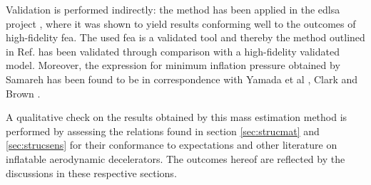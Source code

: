 Validation is performed indirectly: the method \cite{Samareh2011} has been applied in the \gls{edlsa} project \cite{Cianciolo2010}, where it was shown to yield results conforming well to the outcomes of high-fidelity \gls{fea}. The used \gls{fea} is a validated tool \cite{Cianciolo2010} and thereby the method outlined in Ref.\cite{Samareh2011} has been validated through comparison with a high-fidelity validated model. Moreover, the expression for minimum inflation pressure obtained by Samareh has been found to be in correspondence with Yamada et al \cite{Yamada2009}, Clark \cite{Clark2009} and Brown \cite{Brown2009}.

A qualitative check on the results obtained by this mass estimation method is performed by assessing the relations found in section \ref{sec:strucmat} and \ref{sec:strucsens} for their conformance to expectations and other literature on inflatable aerodynamic decelerators. The outcomes hereof are reflected by the discussions in these respective sections.



